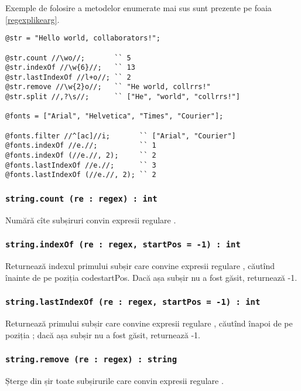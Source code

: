 Exemple de folosire a metodelor enumerate mai sus sunt prezente pe foaia \ref{regexplikearg}.

\begin{lstlisting}[caption=Expresii regulare în calitate de argumente, label=regexplikearg]
@str = "Hello world, collaborators!";

@str.count //\wo//;       `` 5
@str.indexOf //\w{6}//;   `` 13
@str.lastIndexOf //l+o//; `` 2
@str.remove //\w{2}o//;   `` "He world, collrrs!"
@str.split //,?\s//;      `` ["He", "world", "collrrs!"]

@fonts = ["Arial", "Helvetica", "Times", "Courier"];

@fonts.filter //^[ac]//i;       `` ["Arial", "Courier"]
@fonts.indexOf //e.//;          `` 1
@fonts.indexOf (//e.//, 2);     `` 2
@fonts.lastIndexOf //e.//;      `` 3
@fonts.lastIndexOf (//e.//, 2); `` 2
\end{lstlisting}

\subsubsection{\lstinline|string.count (re : regex) : int|}

Numără cîte subșiruri convin expresii regulare .

\subsubsection{\lstinline|string.indexOf (re : regex, startPos = -1) : int|}

Returnează indexul primului subșir care convine expresii regulare , căutînd înainte de pe poziția code{startPos}. Dacă așa subșir nu a fost găsit, returnează -1.

\subsubsection{\lstinline|string.lastIndexOf (re : regex, startPos = -1) : int|}

Returnează primului subșir care convine expresii regulare , căutînd înapoi de pe poziția ; dacă așa subșir nu a fost găsit, returnează -1.

\subsubsection{\lstinline|string.remove (re : regex) : string|}

Șterge din șir toate subșirurile care convin expresii regulare .

